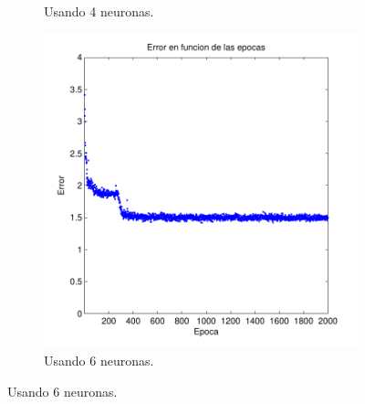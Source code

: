 \documentclass[informe.tex]{subfiles}
\begin{document}
\begin{figure}[H]
\begin{subfigure}[b]{0.32\textwidth}
                \caption{Usando 4 neuronas.}
                \label{fig:d2-f2-2k-01-n4}
        \end{subfigure}
        \begin{subfigure}[b]{0.32\textwidth}
                \includegraphics[width=\textwidth]{graficos/error_fold2_6_binary-regresion_2000_01.pdf}
                \caption{Usando 6 neuronas.}
                \label{fig:d2-f2-2k-01-n6}
        \end{subfigure}
        

\end{figure}
\end{document}
